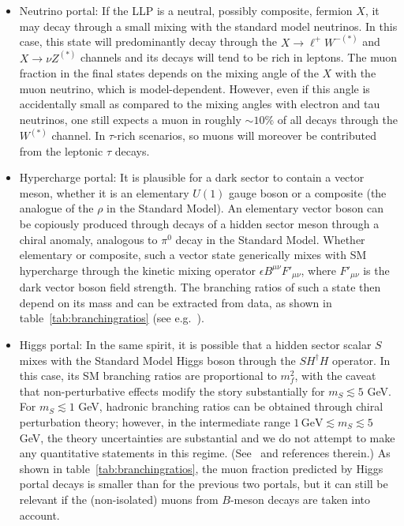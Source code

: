\begin{itemize}
\item Neutrino portal: If the LLP is a neutral, possibly composite, fermion $X$, it may decay through a small mixing with the standard model neutrinos. In this case, this state will predominantly decay through the $X\to \ell^+ W^{-(\ast)}$ and $X\to \nu Z^{(\ast)}$ channels and its decays will tend to be rich in leptons. The muon fraction in the final states depends on the mixing angle of the $X$ with the muon neutrino, which is model-dependent. However, even if this angle is accidentally small as compared to the mixing angles with electron and tau neutrinos, one still expects a muon in roughly $\sim10\%$ of all decays through the $W^{(\ast)}$ channel. In $\tau$-rich scenarios, so muons will moreover be contributed from the leptonic $\tau$ decays.
 
\item Hypercharge portal: It is plausible for a dark sector to contain a vector meson, whether it is an elementary $U(1)$ gauge boson or a composite (the analogue of the $\rho$ in the Standard Model). An elementary vector boson can be  copiously produced through decays of a hidden sector meson through a chiral anomaly, analogous to $\pi^0$ decay in the Standard Model.  Whether elementary or composite, such a vector state generically mixes with SM hypercharge through the kinetic mixing operator $\epsilon B^{\mu\nu}F'_{\mu\nu}$, where $F'_{\mu\nu}$ is the dark vector boson field strength.  The branching ratios of such a state then depend on its mass and can be extracted from data, as shown in table~\ref{tab:branchingratios} (see e.g.~\cite{Meade:2009rb, Curtin:2014cca}). 

\item Higgs portal: In the same spirit, it is possible that a hidden sector scalar $S$ mixes with the Standard Model Higgs boson through the $S H^\dagger H$ operator. In this case, its SM branching ratios are proportional to $m_f^2$, with the caveat that non-perturbative effects modify the story substantially for $m_S\lesssim 5$ GeV. For $m_S\lesssim 1$ GeV, hadronic branching ratios can be obtained through chiral perturbation theory; however, in the intermediate range  $1\, \mathrm{GeV} \lesssim m_S \lesssim 5$ GeV, the theory uncertainties are substantial and we do not attempt to make any quantitative statements in this regime. (See~\cite{Clarke:2013aya} and references therein.) As shown in table~\ref{tab:branchingratios}, the muon fraction predicted by Higgs portal decays is smaller than for the previous two portals, but it can still be relevant if the (non-isolated) muons from $B$-meson decays are taken into account. 


\end{itemize}
